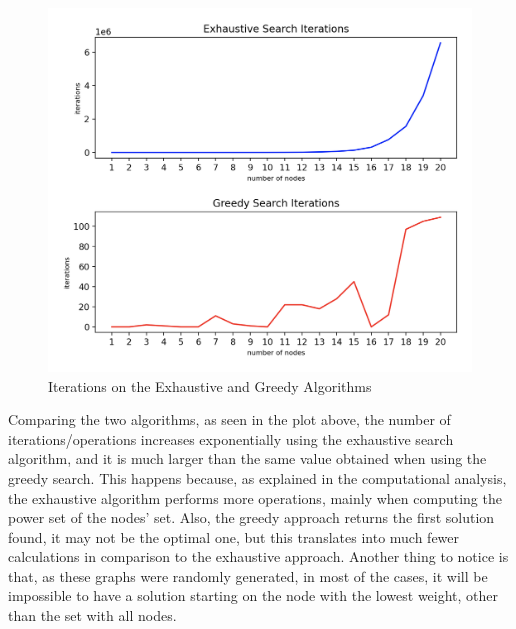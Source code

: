 \documentclass[...]{revdetua}
\begin{document}
\begin{figure}[H]
    \centering
    \includegraphics[width=0.9\columnwidth]{./figures/iterations_0.125.png}
    \caption{Iterations on the Exhaustive and Greedy Algorithms}
    \label{fig: Iterations on the Exhaustive and Greedy Algorithm}
\end{figure}

Comparing the two algorithms, as seen in the plot above, the number of iterations/operations increases exponentially using the exhaustive search algorithm, and it is much larger than the same value obtained when using the greedy search. This happens because, as explained in the computational analysis, the exhaustive algorithm performs more operations, mainly when computing the power set of the nodes' set. Also, the greedy approach returns the first solution found, it may not be the optimal one, but this translates into much fewer calculations in comparison to the exhaustive approach. Another thing to notice is that, as these graphs were randomly generated, in most of the cases, it will be impossible to have a solution starting on the node with the lowest weight, other than the set with all nodes. 
\end{document}
